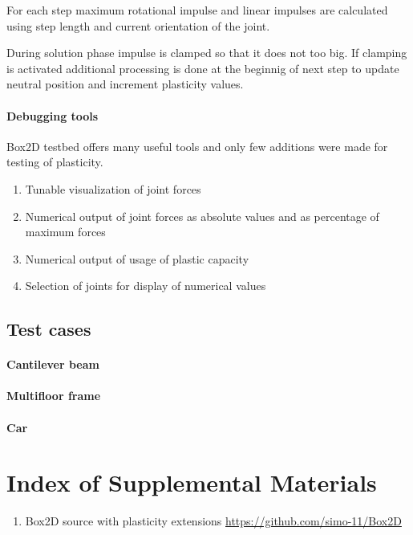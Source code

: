 \documentclass{jcgt}
\begin{document}
For each step maximum rotational impulse and linear impulses are calculated using step length and 
current orientation of the joint.

During solution phase impulse is clamped so that it does not too big.
If clamping is activated additional processing is done at the beginnig of next step to update neutral position and
increment plasticity values.

\paragraph{Debugging tools} 
Box2D testbed offers many useful tools and only few additions were made for testing of plasticity.
\begin{enumerate}
\item Tunable visualization of joint forces
\item Numerical output of joint forces as absolute values and as percentage of maximum forces
\item Numerical output of usage of plastic capacity
\item Selection of joints for display of numerical values
\end{enumerate}

\subsection{Test cases} 

\paragraph{Cantilever beam} 

\paragraph{Multifloor frame} 

\paragraph{Car} 



\small



\section*{Index of Supplemental Materials}

\begin{enumerate}
\item Box2D source with plasticity extensions 
 \href{https://github.com/simo-11/Box2D}{https://github.com/simo-11/Box2D}

\end{enumerate}
\end{document}
